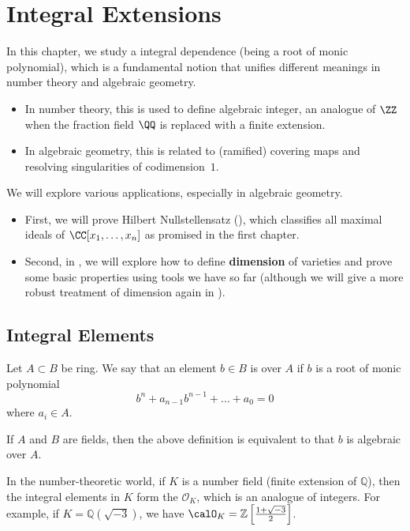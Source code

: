 \chapter{Integral Extensions}
\label{chap:integral}
In this chapter, we study a integral dependence
(being a root of monic polynomial),
which is a fundamental notion that unifies different
meanings in number theory and algebraic geometry.
\begin{itemize}
    \item In number theory, this is used to define
    algebraic integer, an analogue of $\ZZ$
    when the fraction field $\QQ$ is replaced 
    with a finite extension.
    \item In algebraic geometry, this is related to 
    (ramified) covering maps and resolving singularities
    of codimension~$1$.
\end{itemize}
We will explore various applications, especially 
in algebraic geometry.
\begin{itemize}
\item First, we will prove Hilbert Nullstellensatz
(), 
which classifies all maximal ideals of $\CC[x_1,\dots,x_n]$
as promised in the first chapter.
\item Second, in ,
we will explore how to define \textbf{dimension} of varieties
and prove some basic properties using tools we have so far
(although we will give a more robust treatment
of dimension again in ).
\end{itemize}
\section{Integral Elements}
\begin{definition}
    Let $A\subset B$ be ring.
    We say that an element $b\in B$ is
     over $A$ if
    $b$ is a root of monic polynomial
    $$b^n + a_{n-1}b^{n-1}  +\dots + a_0=0$$
    where $a_i\in A$.
\end{definition}
If $A$ and $B$ are fields, then the above definition
is equivalent to that $b$ is algebraic over $A$.

In the number-theoretic world, if $K$
is a number field (finite extension of $\mathbb Q$),
then the integral elements in $K$ form
the  $\mathcal O_K$,
which is an analogue of integers.
For example, if $K=\mathbb Q(\sqrt{-3})$,
we have $\calO_K = \mathbb Z\left[\frac{1+\sqrt{-3}}2\right]$.

